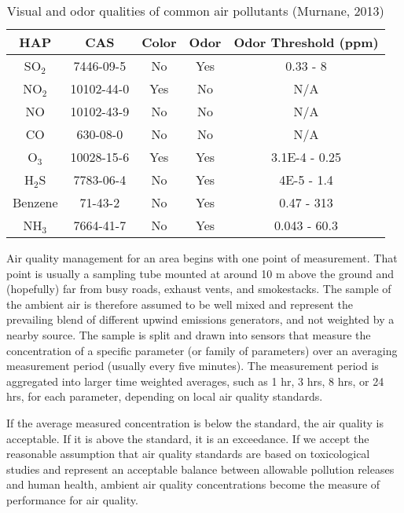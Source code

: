 \begin{table}[H]
\centering
\caption[Visual and odor qualities of common air pollutants]{Visual and odor qualities of common air pollutants (Murnane, 2013)}
\label{tb:odor}
\begin{tabular}{@{}ccccc@{}}
\toprule
\textbf{HAP} & \textbf{CAS} & \textbf{Color} & \textbf{Odor} & \textbf{Odor Threshold (ppm)} \\ \midrule
SO$_{2}$ & 7446-09-5 & No & Yes & 0.33 - 8 \\
NO$_{2}$ & 10102-44-0 & Yes & No & N/A \\
NO & 10102-43-9 & No & No & N/A \\
CO & 630-08-0 & No & No & N/A \\
O$_{3}$ & 10028-15-6 & Yes & Yes & 3.1E-4 - 0.25 \\
H$_{2}$S & 7783-06-4 & No & Yes & 4E-5 - 1.4 \\
Benzene & 71-43-2 & No & Yes & 0.47 - 313 \\
NH$_{3}$ & 7664-41-7 & No & Yes & 0.043 - 60.3 \\ \bottomrule
\end{tabular}
\end{table}

Air quality management for an area begins with one point of measurement. That point is usually a sampling tube mounted at around 10 m above the ground and (hopefully) far from busy roads, exhaust vents, and smokestacks. The sample of the ambient air is therefore assumed to be well mixed and represent the prevailing blend of different upwind emissions generators, and not weighted by a nearby source. The sample is split and drawn into sensors that measure the concentration of a specific parameter (or family of parameters) over an averaging measurement period (usually every five minutes). The measurement period is aggregated into larger time weighted averages, such as 1 hr, 3 hrs, 8 hrs, or 24 hrs, for each parameter, depending on local air quality standards. 

If the average measured concentration is below the standard, the air quality is acceptable. If it is above the standard, it is an exceedance. If we accept the reasonable assumption that air quality standards are based on  toxicological studies and represent an acceptable balance between allowable pollution releases and human health, ambient air quality concentrations become the measure of performance for air quality.

